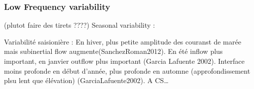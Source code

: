 






\subsubsection{Low Frequency variability}
(plutot faire des tirets ????)
Seasonal variability : 

Variabilité saisionière : En hiver, plus petite amplitude des couranst de marée mais subinertial flow augmente(SanchezRoman2012). En été inflow plus important, en janvier outflow plus important (Garcia Lafuente 2002). Interface moins profonde en début d’année, plus profonde en automne (approfondissement plsu lent que élévation) (GarciaLafuente2002).
A CS…




